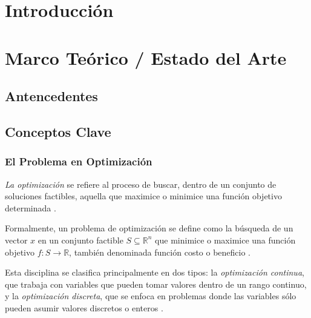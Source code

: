 \documentclass[12pt,titlepage,twoside,openright]{book}
\makeatletter
\def\cleardoublepage{\clearpage\if@twoside \ifodd\c@page\else
\hbox{}
\thispagestyle{empty}
\newpage
\if@twocolumn\hbox{}\newpage\fi\fi\fi}
\makeatother
\begin{document}
\tableofcontents
\cleardoublepage
\listoffigures
\cleardoublepage
\listoftables
\cleardoublepage

\mainmatter
\pagestyle{fancy}
\fancyhf{}
\fancyhead[RO,LE]{\bfseries \thepage}
\fancyhead[LO]{\nouppercase{\rightmark}}
\fancyhead[RE]{\nouppercase{\leftmark}}
\fancyfoot{}

\setlength{\parindent}{0pt}
\setlength{\parskip}{1.5ex}

\chapter{Introducción}
\label{cap:introduccion}

\chapter{Marco Teórico / Estado del Arte}
\label{cap:marco-teorico}
\section{Antencedentes}
\section{Conceptos Clave}
\subsection{El Problema en Optimización}

\textit{La optimización} se refiere al proceso de buscar, dentro de un conjunto de soluciones factibles, aquella que maximice o minimice una función objetivo determinada \citep{bazaraa2006nonlinear}.

Formalmente, un problema de optimización se define como la búsqueda de un vector \( x \) en un conjunto factible \( S \subseteq \mathbb{R}^n \) que minimice o maximice una función objetivo \( f: S \to \mathbb{R} \), también denominada función costo o beneficio \citep{cobos2010}.

Esta disciplina se clasifica principalmente en dos tipos: la \textit{optimización continua}, que trabaja con variables que pueden tomar valores dentro de un rango continuo, y la \textit{optimización discreta}, que se enfoca en problemas donde las variables sólo pueden asumir valores discretos o enteros \citep{cobos2010}.
\end{document}
